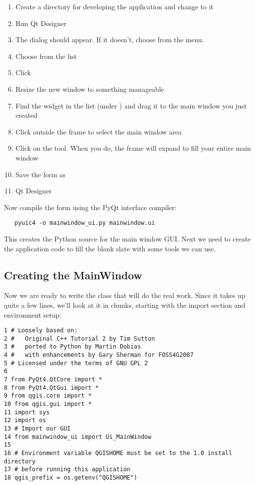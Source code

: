 \begin{enumerate}
\item Create a directory for developing the application and change to it
\item Run Qt Designer
\item The  dialog should appear. If it doesn't, choose
 from the  menu.
\item Choose  from 
the  list
\item Click  
\item Resize the new window to something manageable
\item Find the  widget in the list 
(under ) and drag it to
the main window you just created
\item Click outside the frame to select the main window area 
\item Click on the  tool. When you do, the frame
will expand to fill your entire main window
\item Save the form as  
\item {} Qt Designer
\end{enumerate} 

Now compile the form using the PyQt interface compiler:

\begin{verbatim}
   pyuic4 -o mainwindow_ui.py mainwindow.ui
\end{verbatim}

This creates the Python source for the main window GUI. Next we need to create
the application code to fill the blank slate with some tools we can use.

\subsection{Creating the MainWindow}

Now we are ready to write the  class that will do the real work.
Since it takes up quite a few lines, we'll look at it in chunks, starting
with the import section and environment setup:

\begin{verbatim}
1 # Loosely based on:
2 #   Original C++ Tutorial 2 by Tim Sutton
3 #   ported to Python by Martin Dobias
4 #   with enhancements by Gary Sherman for FOSS4G2007
5 # Licensed under the terms of GNU GPL 2
6
7 from PyQt4.QtCore import *
8 from PyQt4.QtGui import *
9 from qgis.core import *
10 from qgis.gui import *
11 import sys
12 import os
13 # Import our GUI
14 from mainwindow_ui import Ui_MainWindow
15 
16 # Environment variable QGISHOME must be set to the 1.0 install directory
17 # before running this application
18 qgis_prefix = os.getenv("QGISHOME")
\end{verbatim}

